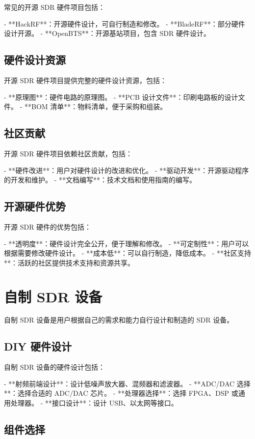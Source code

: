 \documentclass[UTF8]{ctexbook}
\begin{document}
常见的开源 SDR 硬件项目包括：

- **HackRF**：开源硬件设计，可自行制造和修改。
- **BladeRF**：部分硬件设计开源。
- **OpenBTS**：开源基站项目，包含 SDR 硬件设计。

\subsection{硬件设计资源}

开源 SDR 硬件项目提供完整的硬件设计资源，包括：

- **原理图**：硬件电路的原理图。
- **PCB 设计文件**：印刷电路板的设计文件。
- **BOM 清单**：物料清单，便于采购和组装。

\subsection{社区贡献}

开源 SDR 硬件项目依赖社区贡献，包括：

- **硬件改进**：用户对硬件设计的改进和优化。
- **驱动开发**：开源驱动程序的开发和维护。
- **文档编写**：技术文档和使用指南的编写。

\subsection{开源硬件优势}

开源 SDR 硬件的优势包括：

- **透明度**：硬件设计完全公开，便于理解和修改。
- **可定制性**：用户可以根据需要修改硬件设计。
- **成本低**：可以自行制造，降低成本。
- **社区支持**：活跃的社区提供技术支持和资源共享。

\section{自制 SDR 设备}

自制 SDR 设备是用户根据自己的需求和能力自行设计和制造的 SDR 设备。

\subsection{DIY 硬件设计}

自制 SDR 设备的硬件设计包括：

- **射频前端设计**：设计低噪声放大器、混频器和滤波器。
- **ADC/DAC 选择**：选择合适的 ADC/DAC 芯片。
- **处理器选择**：选择 FPGA、DSP 或通用处理器。
- **接口设计**：设计 USB、以太网等接口。

\subsection{组件选择}
\end{document}
